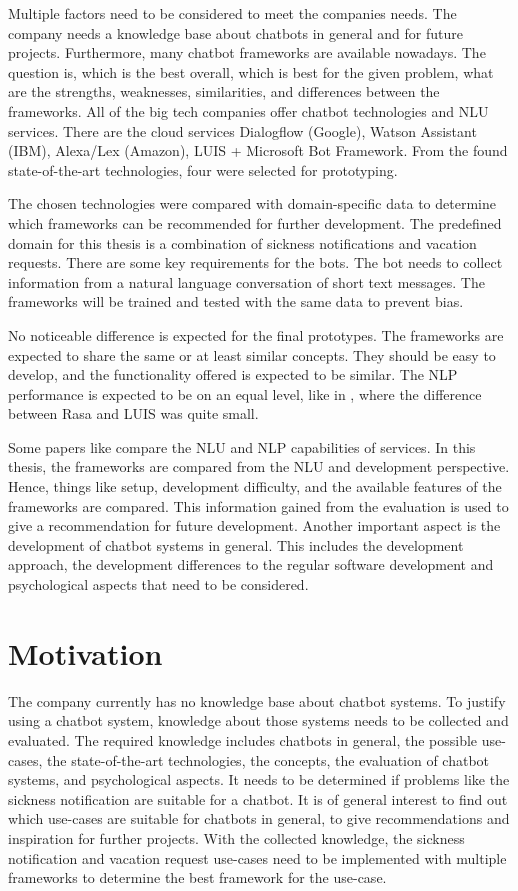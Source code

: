 Multiple factors need to be considered to meet the companies needs.
The company needs a knowledge base about chatbots in general and for future projects. 
Furthermore, many chatbot frameworks are available nowadays.
The question is, which is the best overall, which is best for the given problem, what are the strengths, weaknesses, similarities, and differences between the frameworks.
All of the big tech companies offer chatbot technologies and NLU services.
There are the cloud services Dialogflow (Google), Watson Assistant (IBM), Alexa/Lex (Amazon), LUIS + Microsoft Bot Framework.
From the found state-of-the-art technologies, four were selected for prototyping.

The chosen technologies were compared with domain-specific data to determine which frameworks can be recommended for further development.
The predefined domain for this thesis is a combination of sickness notifications and vacation requests.
There are some key requirements for the bots.
The bot needs to collect information from a natural language conversation of short text messages.
The frameworks will be trained and tested with the same data to prevent bias.

No noticeable difference is expected for the final prototypes.
The frameworks are expected to share the same or at least similar concepts.
They should be easy to develop, and the functionality offered is expected to be similar.
The NLP performance is expected to be on an equal level, like in \citet{braunEvaluatingNLU}, where the difference between Rasa and LUIS was quite small.

Some papers like \citet{braunEvaluatingNLU} compare the NLU and NLP capabilities of services.
In this thesis, the frameworks are compared from the NLU and development perspective.
Hence, things like setup, development difficulty, and 
the available features of the frameworks are compared.
This information gained from the evaluation is used to give a recommendation for future development.
Another important aspect is the development of chatbot systems in general.
This includes the development approach, the development differences to 
the regular software development and psychological aspects that need to be considered.


\section{Motivation} %
The company currently has no knowledge base about chatbot systems.
To justify using a chatbot system, knowledge about those systems needs to be collected and evaluated.
The required knowledge includes chatbots in general, the possible use-cases, the state-of-the-art technologies, the concepts, 
the evaluation of chatbot systems, and psychological aspects.
It needs to be determined if problems like the sickness notification are suitable for a chatbot.
It is of general interest to find out which use-cases are suitable for chatbots in general, to give recommendations and inspiration for further projects.
With the collected knowledge, the sickness notification and vacation request use-cases need to be implemented with multiple frameworks to determine the best framework for the use-case.


